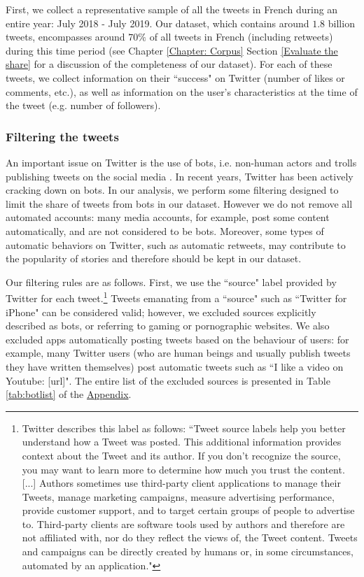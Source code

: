 First, we collect a representative sample of all the tweets in French during an entire year: July 2018 - July 2019. Our dataset, which contains around $1.8$ billion tweets, encompasses around $70\%$ of all tweets in French (including retweets) during this time period (see Chapter \ref{Chapter: Corpus} Section \ref{Evaluate the share} for a discussion of the completeness of our dataset). For each of these tweets, we collect information on their ``success" on Twitter (number of likes or comments, etc.), as well as information on the user's characteristics at the time of the tweet (e.g. number of followers).

\subsubsection{Filtering the tweets}

An important issue on Twitter is the use of bots, i.e. non-human actors and trolls publishing tweets on the social media  \citep[see e.g.][]{Gorodnichenkoetal2018}. In recent years, Twitter has been actively cracking down on bots. In our analysis, we perform some filtering designed to limit the share of tweets from bots in our dataset. However we do not remove all automated accounts: many media accounts, for example, post some content automatically, and are not considered to be bots. Moreover, some types of automatic behaviors on Twitter, such as automatic retweets, may contribute to the popularity of stories and therefore should be kept in our dataset.

Our filtering rules are as follows. First, we use the ``source" label provided by Twitter for each tweet.\footnote{Twitter describes this label as follows: ``Tweet source labels help you better understand how a Tweet was posted. This additional information provides context about the Tweet and its author. If you don’t recognize the source, you may want to learn more to determine how much you trust the content. [...] Authors sometimes use third-party client applications to manage their Tweets, manage marketing campaigns, measure advertising performance, provide customer support, and to target certain groups of people to advertise to. Third-party clients are software tools used by authors and therefore are not affiliated with, nor do they reflect the views of, the Tweet content. Tweets and campaigns can be directly created by humans or, in some circumstances, automated by an application."} 
Tweets emanating from a ``source" such as ``Twitter for iPhone" can be considered valid; however, we excluded sources explicitly described as bots, or referring to gaming or pornographic websites. We also excluded apps automatically posting tweets based on the behaviour of users: for example, many Twitter users (who are human beings and usually publish tweets they have written themselves) post automatic tweets such as ``I like a video on Youtube: [url]". The entire list of the excluded sources is presented in Table \ref{tab:botlist} of the \hyperlink{ref:Appendix}{Appendix}. 

